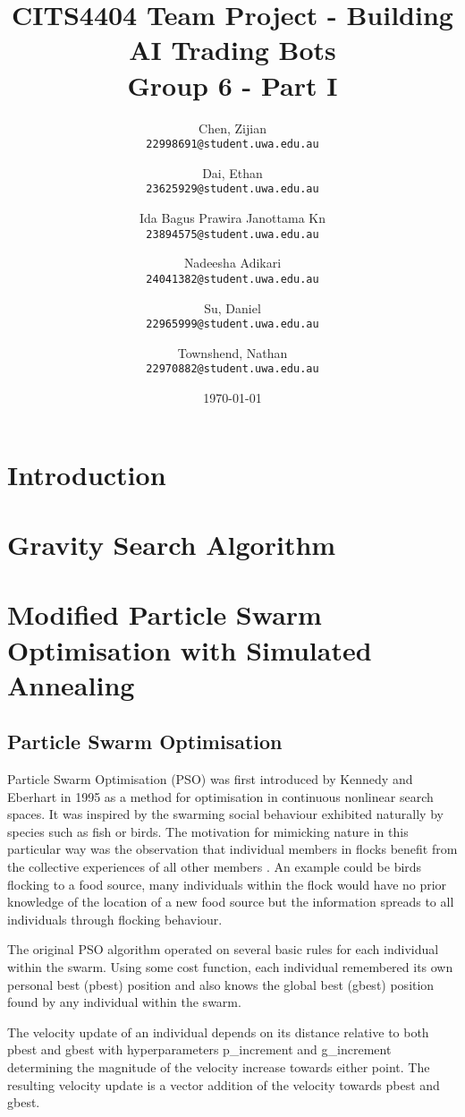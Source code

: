 \documentclass[a4paper, 12pt]{extarticle}
\title{
    CITS4404 Team Project - Building AI Trading Bots
    \\ \large Group 6 - Part I 
}
\author{
    Chen, Zijian\\
    \normalsize \texttt{22998691@student.uwa.edu.au}
    \and
    Dai, Ethan\\
    \normalsize \texttt{23625929@student.uwa.edu.au}
    \and
    Ida Bagus Prawira Janottama Kn\\
    \normalsize \texttt{23894575@student.uwa.edu.au}
    \and
    Nadeesha Adikari\\
    \normalsize \texttt{24041382@student.uwa.edu.au}
    \and
    Su, Daniel\\
    \normalsize \texttt{22965999@student.uwa.edu.au}
    \and
    Townshend, Nathan\\
    \normalsize \texttt{22970882@student.uwa.edu.au}
}
\date{\today}
\begin{document}
\clearpage

\maketitle


\newpage
\tableofcontents


\newpage
\section{Introduction}\label{sec:intro}
% 


\newpage
\section{Gravity Search Algorithm}\label{sec:alg:gsa}


\newpage
\section{Modified Particle Swarm Optimisation with Simulated Annealing}

\subsection{Particle Swarm Optimisation}

Particle Swarm Optimisation (PSO) was first introduced by Kennedy and Eberhart \cite{kennedy1995particle} in 1995 as a method for optimisation in continuous nonlinear search spaces. It was inspired by the swarming social behaviour exhibited naturally by species such as fish or birds. The motivation for mimicking nature in this particular way was the observation that individual members in flocks benefit from the collective experiences of all other members \cite{wilson2000sociobiology}. An example could be birds flocking to a food source, many individuals within the flock would have no prior knowledge of the location of a new food source but the information spreads to all individuals through flocking behaviour. 

The original PSO algorithm operated on several basic rules for each individual within the swarm. Using some cost function, each individual remembered its own personal best (pbest) position and also knows the global best (gbest) position found by any individual within the swarm.

The velocity update of an individual depends on its distance relative to both pbest and gbest with hyperparameters p\_increment and g\_increment determining the magnitude of the velocity increase towards either point. The resulting velocity update is a vector addition of the velocity towards pbest and gbest.
\end{document}
